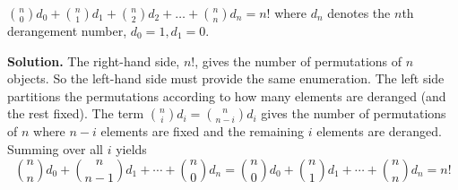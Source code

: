 \documentclass{book}
\begin{document}
\setcounter{project}{107}
\addtocounter{project}{-1}
\begin{activity}[]\label{activity-100}
\hypertarget{p-760}{}%
\(\binom{n}{0} d_{0} + \binom{n}{1} d_{1} + \binom{n}{2} d_{2} + \ldots + \binom{n}{n} d_{n} = n!\) where \(d_{n}\) denotes the \(n\)th derangement number, \(d_{0} = 1,d_{1} = 0\).%
\par\smallskip%
\noindent\textbf{Solution.}\hypertarget{solution-72}{}\quad%
\hypertarget{p-761}{}%
The right-hand side, \(n!\), gives the number of permutations of \(n\) objects. So the left-hand side must provide the same enumeration. The left side partitions the permutations according to how many elements are deranged (and the rest fixed). The term \(\binom{n}{i} d_{i} = \binom{n}{n - i} d_{i}\) gives the number of permutations of \(n\) where \(n - i\) elements are fixed and the remaining \(i\) elements are deranged. Summing over all \(i\) yields%
\begin{equation*}
\binom{n}{n} d_{0} + \binom{n}{n - 1} d_{1} + \cdots + \binom{n}{0} d_{n} = \binom{n}{0} d_{0} + \binom{n}{1} d_{1} + \cdots + \binom{n}{n} d_{n} = n!
\end{equation*}
%
\end{activity}
\end{document}

